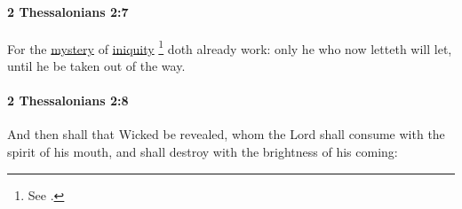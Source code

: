 		\paragraph{2 Thessalonians 2:7} %
			\label{2THESSALONIANS-2-7}

			For the \hyperref[MYSTERY]{mystery} of \hyperref[INIQUITY]{iniquity}%
				\footnote{%
					\label{2THESSALONIANS-2-7-iniquity}%
					See \hyperref[ANOMIA]{}.
					}
			doth already work: only he who now letteth will let, until he be taken out of the way.

			\begin{framed}
			\scriptsize
				\begin{compactdesc}
					\item[SBLG] 
				\end{compactdesc}
			\end{framed}

		\paragraph{2 Thessalonians 2:8} %
			\label{2THESSALONIANS-2-8}

			And then shall that Wicked be revealed, whom the Lord shall consume with the spirit of his mouth, and shall destroy with the brightness of his coming:


